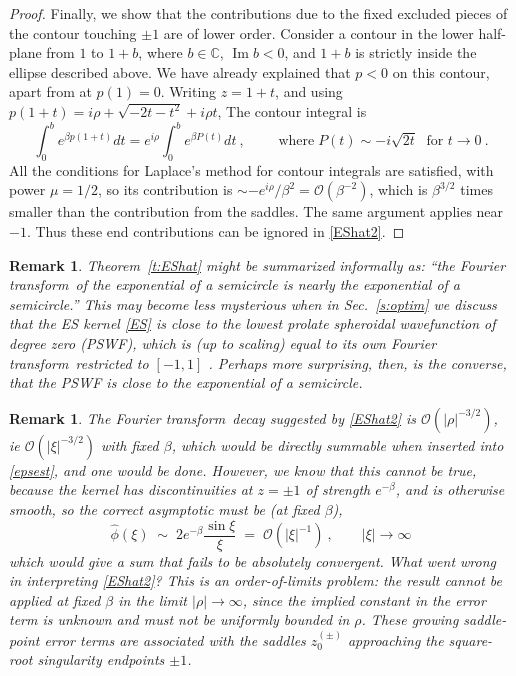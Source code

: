 \documentclass[10pt]{article}
\newcommand{\be}{\begin{equation}}
\newcommand{\ee}{\end{equation}}
\newcommand{\bigO}{{\mathcal O}}
\DeclareMathOperator{\im}{Im}
\newtheorem{rmk}[thm]{Remark}
\newcommand{\freq}{\beta}          %
\newcommand{\FT}{Fourier transform}
\begin{document}
\begin{proof}
Finally, we show that the contributions due to the fixed excluded
pieces of the contour touching $\pm1$ are of lower order.
Consider a contour in the lower half-plane
from $1$ to $1+b$, where $b\in\mathbb{C}$, $\im b<0$,
and $1+b$ is strictly inside the ellipse described above.
We have already explained that $p<0$ on this contour, apart from at $p(1)=0$.
Writing $z=1+t$, and using $p(1+t) = i\rho + \sqrt{-2t-t^2} + i\rho t$,
The contour integral is
$$ \int_0^b e^{\freq p(1+t)} dt = e^{i\rho}\int_0^b e^{\freq P(t)} dt
~,\qquad \mbox{ where} \; P(t) \sim -i\sqrt{2t} \; \mbox{ for } t\to 0~.
$$
All the conditions for
Laplace's method for contour integrals \cite[Thm.~6.1, p.~125]{olver}
are satisfied, with power $\mu=1/2$,
so its contribution is $\sim -e^{i\rho}/\freq^2 = \bigO(\freq^{-2})$,
which is $\freq^{3/2}$ times smaller than the contribution from the saddles.
The same argument applies near $-1$.
Thus these end contributions can be ignored in \eqref{EShat2}.
\end{proof}

\begin{rmk}
  Theorem~\ref{t:EShat} might be summarized informally as:
  ``the \FT\ of the exponential
  of a semicircle is nearly the exponential of a semicircle.''
  This may become less mysterious when
    in Sec.~\ref{s:optim} we discuss that
    the ES kernel \eqref{ES} is close
    to the lowest prolate spheroidal wavefunction of degree zero (PSWF),
    which is (up to scaling)
    equal to its own \FT\ restricted to $[-1,1]$ \cite{osipov}.
    Perhaps more
    surprising, then, is the converse, that the PSWF is close to the exponential
    of a semicircle. %
%
\end{rmk}  

\begin{rmk}
The \FT\ decay suggested by \eqref{EShat2} is $\bigO(|\rho|^{-3/2})$,
ie $\bigO(|\xi|^{-3/2})$ with fixed $\freq$,
which would be directly summable when inserted into \eqref{epsest},
and one would be done.
However, we know that this cannot be true,
because the kernel has discontinuities at $z=\pm 1$ of strength $e^{-\freq}$,
and is otherwise smooth, so
the correct asymptotic must be (at fixed $\freq$),
\be
\hat\phi(\xi) \;\sim\; 2 e^{-\freq} \frac{\sin \xi}{\xi} \;=\; \bigO(|\xi|^{-1})
~, \qquad |\xi|\to\infty
\label{sinc}
\ee
which would give a sum that fails to be absolutely convergent.
What went wrong in interpreting \eqref{EShat2}?
This is an order-of-limits problem:
the result cannot be applied at fixed $\freq$
in the limit $|\rho|\to\infty$, since the implied constant in the error
term is unknown and must not be uniformly bounded in $\rho$.
These growing saddle-point
error terms are associated with the saddles $z_0^{(\pm)}$ approaching
the square-root singularity endpoints $\pm1$.
\label{r:decay}
\end{rmk}
\end{document}
